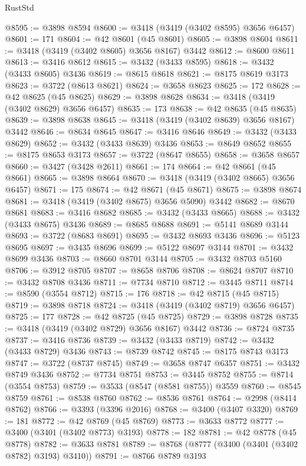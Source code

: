 \begin{lexlean}{RustStd}
\begin{coremodule}
@8595 := @3898 @8594
@8600 := @3418 (@3419 (@3402 @8595) @3656 @6457)
@8601 := 171
@8604 := @42 @8601 (@45 @8601)
@8605 := @3898 @8604
@8611 := @3418 (@3419 (@3402 @8605) @3656 @8167) @3442
@8612 := @8600 @8611
@8613 := @3416 @8612
@8615 := @3432 (@3433 @8595)
@8618 := @3432 (@3433 @8605) @3436
@8619 := @8615 @8618
@8621 := @8175 @8619 @3173
@8623 := @3722 (@8613 @8621)
@8624 := @3658 @8623
@8625 := 172
@8628 := @42 @8625 (@45 @8625)
@8629 := @3898 @8628
@8634 := @3418 (@3419 (@3402 @8629) @3656 @6457)
@8635 := 173
@8638 := @42 @8635 (@45 @8635)
@8639 := @3898 @8638
@8645 := @3418 (@3419 (@3402 @8639) @3656 @8167) @3442
@8646 := @8634 @8645
@8647 := @3416 @8646
@8649 := @3432 (@3433 @8629)
@8652 := @3432 (@3433 @8639) @3436
@8653 := @8649 @8652
@8655 := @8175 @8653 @3173
@8657 := @3722 (@8647 @8655)
@8658 := @3658 @8657
@8660 := @3427 (@3428 @2611)
@8661 := 174
@8664 := @42 @8661 (@45 @8661)
@8665 := @3898 @8664
@8670 := @3418 (@3419 (@3402 @8665) @3656 @6457)
@8671 := 175
@8674 := @42 @8671 (@45 @8671)
@8675 := @3898 @8674
@8681 := @3418 (@3419 (@3402 @8675) @3656 @5090) @3442
@8682 := @8670 @8681
@8683 := @3416 @8682
@8685 := @3432 (@3433 @8665)
@8688 := @3432 (@3433 @8675) @3436
@8689 := @8685 @8688
@8691 := @5141 @8689 @3144
@8693 := @3722 (@8683 @8691)
@8695 := @3432 @8693 @3436
@8696 := @5123 @8695
@8697 := @3435 @8696
@8699 := @5122 @8697 @3144
@8701 := @3432 @8699 @3436
@8703 := @8660 @8701 @3144
@8705 := @3432 @8703 @5160
@8706 := @3912 @8705
@8707 := @8658 @8706
@8708 := @8624 @8707
@8710 := @3432 @8708 @3436
@8711 := @7734 @8710
@8712 := @3445 @8711
@8714 := @8590 (@3554 @8712)
@8715 := 176
@8718 := @42 @8715 (@45 @8715)
@8719 := @3898 @8718
@8724 := @3418 (@3419 (@3402 @8719) @3656 @6457)
@8725 := 177
@8728 := @42 @8725 (@45 @8725)
@8729 := @3898 @8728
@8735 := @3418 (@3419 (@3402 @8729) @3656 @8167) @3442
@8736 := @8724 @8735
@8737 := @3416 @8736
@8739 := @3432 (@3433 @8719)
@8742 := @3432 (@3433 @8729) @3436
@8743 := @8739 @8742
@8745 := @8175 @8743 @3173
@8747 := @3722 (@8737 @8745)
@8749 := @3658 @8747 @6357
@8751 := @3432 @8749 @3436
@8752 := @7734 @8751
@8753 := @3445 @8752
@8755 := @8714 (@3554 @8753)
@8759 := @3533 (@8547 (@8581 @8755)) @3559
@8760 := @8545 @8759
@8761 := @8538 @8760
@8762 := @8536 @8761
@8764 := @2998 (@8414 @8762)
@8766 := @3393 (@3396 @2016)
@8768 := @3400 (@3407 @3320)
@8769 := 181
@8772 := @42 @8769 (@45 @8769)
@8773 := @3633 @8772
@8777 := @3400 (@3401 (@3402 @8773) @3193)
@8778 := 182
@8781 := @42 @8778 (@45 @8778)
@8782 := @3633 @8781
@8789 := @8768 (@8777 (@3400 (@3401 (@3402 @8782) @3193) @3410))
@8791 := @8766 @8789 @3193

\end{coremodule}
\end{lexlean}
